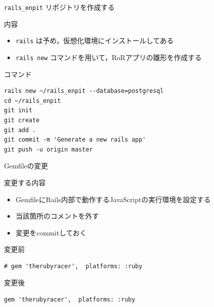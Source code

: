 \documentclass[t, aspectratio=169]{beamer}
\begin{document}
\begin{frame}[fragile,label=sec-6-1-3]{\texttt{rails\_enpit} リポジトリを作成する}
 \begin{block}{内容}
\begin{itemize}
\item \texttt{rails} は予め，仮想化環境にインストールしてある
\item \texttt{rails new} コマンドを用いて，RoRアプリの雛形を作成する
\end{itemize}
\end{block}

\begin{block}{コマンド}
\begin{verbatim}
rails new ~/rails_enpit --database=postgresql
cd ~/rails_enpit
git init
git create
git add .
git commit -m 'Generate a new rails app'
git push -u origin master
\end{verbatim}
\end{block}
\end{frame}
\begin{frame}[fragile,label=sec-6-1-4]{Gemfileの変更}
 \begin{block}{変更する内容}
\begin{itemize}
\item GemfileにRails内部で動作するJavaScriptの実行環境を設定する
\item 当該箇所のコメントを外す
\item 変更をcommitしておく
\end{itemize}
\end{block}

\begin{block}{変更前}
\begin{verbatim}
# gem 'therubyracer',  platforms: :ruby
\end{verbatim}
\end{block}
\begin{block}{変更後}
\begin{verbatim}
gem 'therubyracer',  platforms: :ruby
\end{verbatim}
\end{block}
\end{frame}
\end{document}
